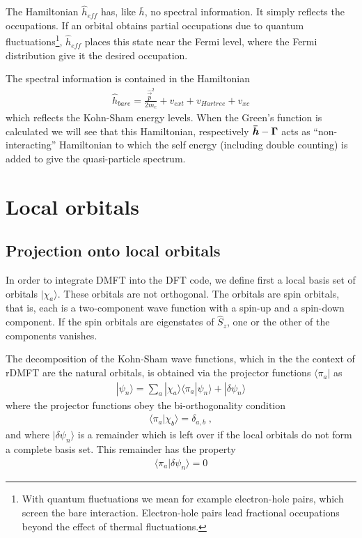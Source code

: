 \documentclass[11pt,a4paper]{report}
\begin{document}
The Hamiltonian $\hat{h}_{eff}$ has, like $\bar{h}$, no spectral
information. It simply reflects the occupations. If an orbital obtains
partial occupations due to quantum fluctuations\footnote{With quantum
  fluctuations we mean for example electron-hole pairs, which screen
  the bare interaction. Electron-hole pairs lead fractional
  occupations beyond the effect of thermal fluctuations.},
$\hat{h}_{eff}$ places this state near the Fermi level, where the
Fermi distribution give it the desired occupation.

The spectral information is contained in the Hamiltonian
\begin{eqnarray}
\hat{h}_{bare}=\frac{\hat{\vec{p}}^2}{2m_e}+v_{ext}+v_{Hartree}+v_{xc}
\end{eqnarray}
which reflects the Kohn-Sham energy levels. When the Green's function
is calculated we will see that this Hamiltonian, respectively
$\bm{\bar{h}}-\bm{\Gamma}$ acts as ``non-interacting'' Hamiltonian to
which the self energy (including double counting) is added to give the
quasi-particle spectrum.



%
\newpage
\section{Local orbitals}
\subsection{Projection onto local orbitals}
In order to integrate DMFT into the DFT code, we define first a local
basis set of orbitals $|\chi_a\rangle$. These orbitals are not
orthogonal. The orbitals are spin orbitals, that is, each is a
two-component wave function with a spin-up and a spin-down
component. If the spin orbitals are eigenstates of $\hat{S}_z$, one or
the other of the components vanishes.

The decomposition of the Kohn-Sham wave functions,
which in the the context of rDMFT are the natural orbitals, is
obtained via the projector functions $\langle\pi_a|$ as
\begin{eqnarray}
|\psi_n\rangle=\sum_a|\chi_a\rangle\langle\pi_a|\psi_n\rangle
+|\delta\psi_n\rangle
\end{eqnarray}
where the projector functions obey the bi-orthogonality condition
\begin{eqnarray}
\langle\pi_a|\chi_b\rangle=\delta_{a,b}\;,
\end{eqnarray}
and where $|\delta\psi_n\rangle$ is a remainder which is left over if the
local orbitals do not form a complete basis set. This remainder has
the property
\begin{eqnarray}
\langle\pi_a|\delta\psi_n\rangle=0
\end{eqnarray}
\end{document}
